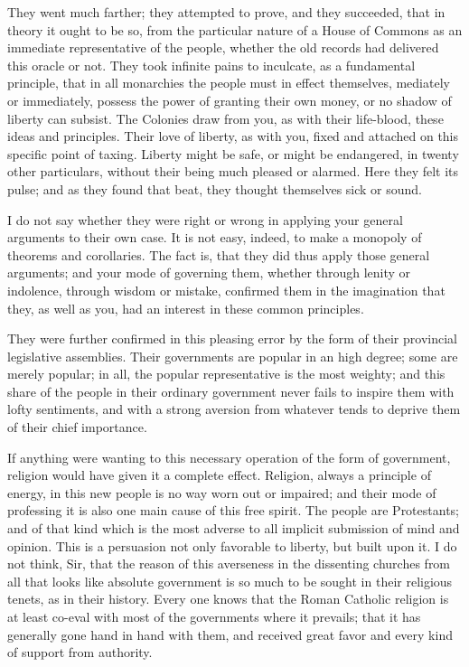 They went much farther; they attempted to prove, and they succeeded, that in theory it ought to be so, from the particular nature of a House of Commons as an immediate representative of the people, whether the old records had delivered this oracle or not. They took infinite pains to inculcate, as a fundamental principle, that in all monarchies the people must in effect themselves, mediately or immediately, possess the power of granting their own money, or no shadow of liberty can subsist. The Colonies draw from you, as with their life-blood, these ideas and principles. Their love of liberty, as with you, fixed and attached on this specific point of taxing. Liberty might be safe, or might be endangered, in twenty other particulars, without their being much pleased or alarmed. Here they felt its pulse; and as they found that beat, they thought themselves sick or sound.\par

I do not say whether they were right or wrong in applying your general arguments to their own case. It is not easy, indeed, to make a monopoly of theorems and corollaries. The fact is, that they did thus apply those general arguments; and your mode of governing them, whether through lenity or indolence, through wisdom or mistake, confirmed them in the imagination that they, as well as you, had an interest in these common principles.\par

They were further confirmed in this pleasing error by the form of their provincial legislative assemblies. Their governments are popular in an high degree; some are merely popular; in all, the popular representative is the most weighty; and this share of the people in their ordinary government never fails to inspire them with lofty sentiments, and with a strong aversion from whatever tends to deprive them of their chief importance.\par

If anything were wanting to this necessary operation of the form of government, religion would have given it a complete effect. Religion, always a principle of energy, in this new people is no way worn out or impaired; and their mode of professing it is also one main cause of this free spirit. The people are Protestants; and of that kind which is the most adverse to all implicit submission of mind and opinion. This is a persuasion not only favorable to liberty, but built upon it. I do not think, Sir, that the reason of this averseness in the dissenting churches from all that looks like absolute government is so much to be sought in their religious tenets, as in their history. Every one knows that the Roman Catholic religion is at least co-eval with most of the governments where it prevails; that it has generally gone hand in hand with them, and received great favor and every kind of support from authority.\par

